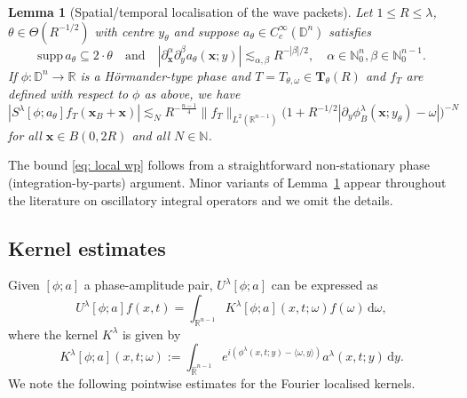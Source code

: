 \documentclass[reqno]{amsart}
\numberwithin{equation}{section}
\newcommand{\D}{\mathbb{D}}
\newcommand{\N}{\mathbb{N}}
\newcommand{\R}{\mathbb{R}}
\newcommand{\ud}{\mathrm{d}}
\newcommand{\bx}{\mathbf{x}}
\newcommand{\bT}{\mathbf{T}}
\def\inn#1#2{\langle#1,#2\rangle}
\theoremstyle{plain}
\newtheorem{lemma}[theorem]{Lemma}
\theoremstyle{definition}
\newcommand{\supp}{\mathrm{supp}\,}
\begin{document}
\begin{lemma}[Spatial/temporal localisation of the wave packets]\label{lem: local wp}
Let $1 \leq R \leq \lambda$, $\theta \in \Theta(R^{-1/2})$ with centre $y_{\theta}$ and suppose $a_{\theta} \in C^{\infty}_c(\D^n)$ satisfies
\begin{equation*}
\supp a_{\theta} \subseteq 2 \cdot \theta \quad \textrm{and} \quad |\partial_{\bx}^{\alpha} \partial_y^{\beta} a_{\theta}(\bx;y)| \lesssim_{\alpha, \beta} R^{-|\beta|/2}, \quad \alpha \in \N_0^n, \beta \in \N_0^{n-1}. 
\end{equation*}
If $\phi \colon \D^n \to \R$ is a H\"ormander-type phase and $T = T_{\theta,\omega} \in \bT_{\theta}(R)$ and $f_T$ are defined with respect to $\phi$ as above, we have
\begin{equation}\label{eq: local wp}
   |S^{\lambda}[\phi;a_{\theta}]f_T(\bx_B +\bx)| \lesssim_N R^{-\frac{n-1}{4}}\|f_T\|_{L^2(\R^{n-1})} \big(1 + R^{-1/2}|\partial_y \phi_B^{\lambda}(\bx;y_{\theta}) - \omega| \big)^{-N}
\end{equation}
for all $\bx \in B(0, 2R)$ and all $N \in \N$.
\end{lemma}

The bound \eqref{eq: local wp} follows from a straightforward non-stationary phase (integration-by-parts) argument. Minor variants of Lemma~\ref{lem: local wp} appear throughout the literature on oscillatory integral operators and we omit the details. 




\subsection{Kernel estimates}
Given $[\phi; a]$ a phase-amplitude pair, $U^{\lambda}[\phi; a]$ can be expressed as
\begin{equation*}
    U^{\lambda}[\phi; a]f(x, t) = \int_{\R^{n-1}} K^{\lambda}[\phi; a](x, t;\omega) f(\omega)\,\ud \omega,
\end{equation*}
where the kernel $K^{\lambda}$ is given by
\begin{equation*}
    K^{\lambda}[\phi; a](x,t;\omega) := \int_{\widehat{\R}^{n-1}} e^{i (\phi^{\lambda}(x,t;y) - \inn{\omega}{y})} a^{\lambda}(x,t;y)\,\ud y. 
\end{equation*}
We note the following pointwise estimates for the Fourier localised kernels. 
\end{document}
